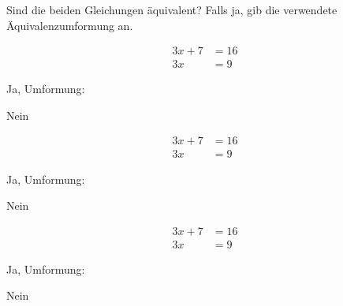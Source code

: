 \documentclass{uebungsblatt}
\begin{document}
\begin{exercise}
    Sind die beiden Gleichungen äquivalent? Falls ja, gib die verwendete Äquivalenzumformung an.
    \begin{multicols}{3}
        \begin{align*}
            3x+7&=16\\
            3x&=9
        \end{align*}
        \begin{multiplechoice}
            \item Ja, Umformung: \answerfield{1cm}{}
            \item Nein
        \end{multiplechoice}

        \begin{align*}
            3x+7&=16\\
            3x&=9
        \end{align*}
        \begin{multiplechoice}
            \item Ja, Umformung: \answerfield{1cm}{}
            \item Nein
        \end{multiplechoice}

        \begin{align*}
            3x+7&=16\\
            3x&=9
        \end{align*}
        \begin{multiplechoice}
            \item Ja, Umformung: \answerfield{1cm}{}
            \item Nein
        \end{multiplechoice}
    \end{multicols}
\end{exercise}

\end{document}
